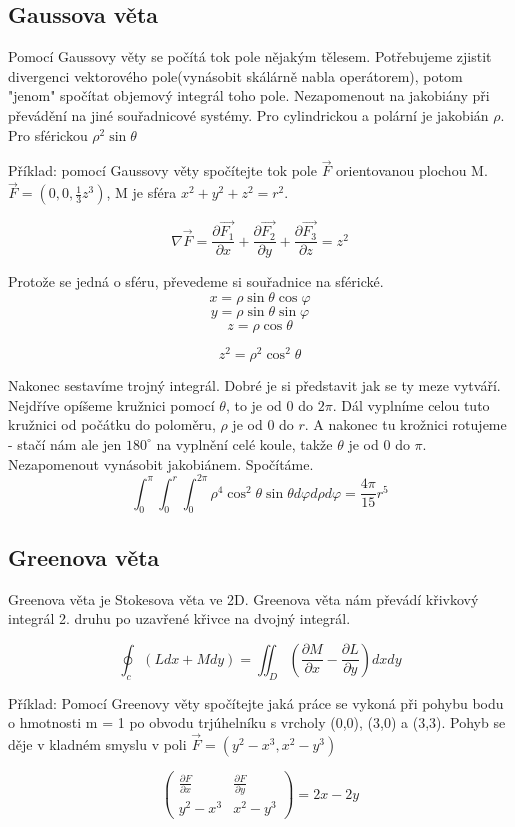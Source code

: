 \documentclass[12pt, letterpaper]{article}
\begin{document}
\subsection*{Gaussova věta}
Pomocí Gaussovy věty se počítá tok pole nějakým tělesem.
Potřebujeme zjistit divergenci vektorového pole(vynásobit skálárně nabla operátorem), potom "jenom" spočítat objemový integrál toho pole.
Nezapomenout na jakobiány při převádění na jiné souřadnicové systémy.
Pro cylindrickou a polární je jakobián $\rho$.
Pro sférickou $\rho^2 \sin \theta$


Příklad: pomocí Gaussovy věty spočítejte tok pole $\vec{F}$ orientovanou plochou M. $\vec{F} = (0, 0, \frac{1}{3}z^3)$, M je sféra $x^2 + y^2 + z^2 = r^2$.

\[\nabla \vec{F} = \frac{\partial \vec{F_1}}{\partial x} + \frac{\partial \vec{F_2}}{\partial y} + \frac{\partial \vec{F_3}}{\partial z} = z^2\]

Protože se jedná o sféru, převedeme si souřadnice na sférické.
\[x = \rho \sin \theta \cos \varphi \]
\[y = \rho \sin \theta \sin \varphi \]
\[z = \rho \cos \theta \]

\[z^2 = \rho^2 \cos^2 \theta \]

Nakonec sestavíme trojný integrál. Dobré je si představit jak se ty meze vytváří.
Nejdříve opíšeme kružnici pomocí $\theta$, to je od $0$ do $2\pi$.
Dál vyplníme celou tuto kružnici od počátku do poloměru, $\rho$ je od $0$ do $r$.
A nakonec tu krožnici rotujeme - stačí nám ale jen $180^{\circ}$ na vyplnění celé koule, takže $\theta$ je od $0$ do $\pi$.
Nezapomenout vynásobit jakobiánem. Spočítáme.
\[\int_0^\pi\int_0^r\int_0^{2\pi}  \rho^4 \cos^2 \theta \sin \theta d\varphi d\rho d\varphi = \frac{4 \pi}{15}r^5\]  


\subsection*{Greenova věta}
Greenova věta je Stokesova věta ve 2D.
Greenova věta nám převádí křivkový integrál 2. druhu po uzavřené křivce na dvojný integrál.

\[ \oint_c (L dx + M dy) = \iint_D \left(\frac{\partial M}{\partial x} - \frac{\partial L}{\partial y} \right) dx dy\]

Příklad: Pomocí Greenovy věty spočítejte jaká práce se vykoná při pohybu bodu o hmotnosti m = 1 po obvodu trjúhelníku s vrcholy (0,0), (3,0) a (3,3). Pohyb se děje v kladném smyslu v poli $\vec{F} = (y^2 - x^3, x^2 - y^3)$

\[\begin{pmatrix}
\frac{\partial F}{\partial x} & \frac{\partial F}{\partial y}\\
y^2 - x^3 & x^2 - y^3
\end{pmatrix} = 2x - 2y\]
\end{document}
